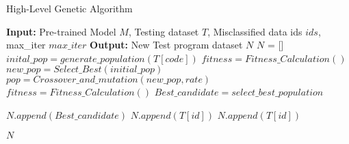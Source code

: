 \begin{algorithm}
\caption{High-Level Genetic Algorithm}
\label{alg:GA}
\begin{algorithmic}[1]
\STATE \textbf{Input:} Pre-trained Model $M$, \newline Testing dataset $T$, \newline Misclassified data ids $ids$, \newline max\_iter $max\_iter$
\STATE \textbf{Output:} New Test program dataset $N$
\STATE $N$ = []
        \STATE $inital\_pop =generate\_population(T[code])$
        \STATE$fitness = Fitness\_Calculation()$
        \STATE$new\_pop = Select\_Best(initial\_pop)$
        \STATE$pop = Crossover\_and\_mutation(new\_pop, rate)$
        \STATE$fitness = Fitness\_Calculation()$ 
        \STATE$Best\_candidate = select\_best\_population$

            \STATE$N.append(Best\_candidate)$      
        \ELSE
            \STATE$N.append(T[id])$
        \ENDIF
    \ENDWHILE
    \ELSE
         \STATE$N.append(T[id])$
    \ENDIF
\ENDFOR

\RETURN $N$
    
\end{algorithmic}
\end{algorithm}
